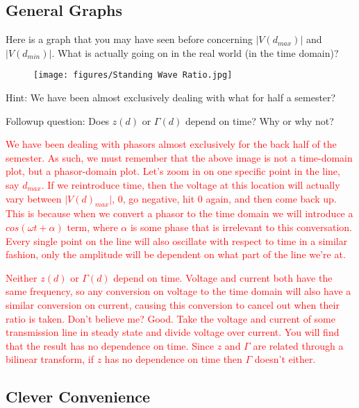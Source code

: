 \documentclass{article}
\begin{document}
\vfill
\newpage

\subsection{General Graphs}

Here is a graph that you may have seen before concerning $\vert V(d_{max}) \vert$ and $\vert V(d_{min}) \vert$. What is actually going on in the real world (in the time domain)?

\begin{figure}[h]
\begin{center}
    \texttt{[image: figures/Standing Wave Ratio.jpg]}
\end{center}
\end{figure}

Hint: We have been almost exclusively dealing with what for half a semester?

Followup question: Does $z(d)$ or $\Gamma(d)$ depend on time? Why or why not?

\textcolor{red}{We have been dealing with phasors almost exclusively for the back half of the semester. As such, we must remember that the above image is not a time-domain plot, but a phasor-domain plot. Let's zoom in on one specific point in the line, say $d_{max}$. If we reintroduce time, then the voltage at this location will actually vary between $\vert V(d)_{max} \vert$, 0, go negative, hit 0 again, and then come back up. This is because when we convert a phasor to the time domain we will introduce a $cos(\omega t + \alpha)$ term, where $\alpha$ is some phase that is irrelevant to this conversation. Every single point on the line will also oscillate with respect to time in a similar fashion, only the amplitude will be dependent on what part of the line we're at.}

\textcolor{red}{Neither $z(d)$ or $\Gamma(d)$ depend on time. Voltage and current both have the same frequency, so any conversion on voltage to the time domain will also have a similar conversion on current, causing this conversion to cancel out when their ratio is taken. Don't believe me? Good. Take the voltage and current of some transmission line in steady state and divide voltage over current. You will find that the result has no dependence on time. Since $z$ and $\Gamma$ are related through a bilinear transform, if $z$ has no dependence on time then $\Gamma$ doesn't either.}

\vfill

\subsection{Clever Convenience}
\end{document}
